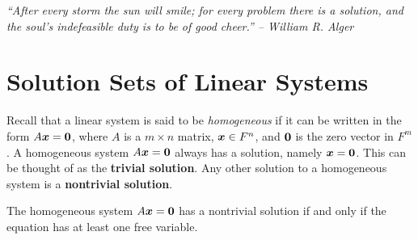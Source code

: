 \begin{center} 
\emph{``After every storm the sun will smile; for every problem there is a solution, and the soul's indefeasible duty is to be of good cheer.'' --  William R. Alger}
\end{center}

\section{Solution Sets of Linear Systems}\label{sec:solutionset}
Recall that a linear system is said to be \emph{homogeneous} if it can be written in the form $A\boldsymbol x = \boldsymbol 0$, where $A$ is a $m\times n$ matrix, $\boldsymbol x \in F^n$, and $\boldsymbol 0$ is the zero vector in $F^m$. A homogeneous system $A\boldsymbol x = \boldsymbol 0$ always has a solution, namely $\boldsymbol x = \boldsymbol 0$. This can be thought of as the \textbf{trivial solution}. Any other solution to a homogeneous system is a \textbf{nontrivial solution}.\\

\begin{Thm} The homogeneous system $A\boldsymbol x = \boldsymbol 0$ has a nontrivial solution if and only if the equation has at least one free variable.
\end{Thm}\vs

